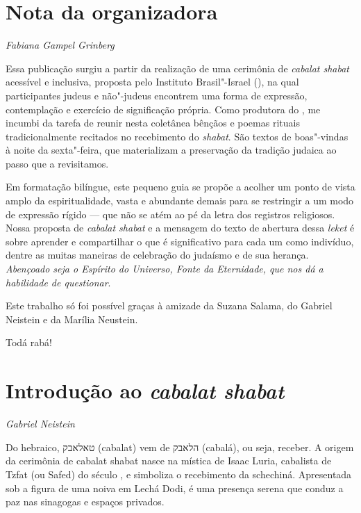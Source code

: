 

\chapter*{Nota da organizadora}


\begin{flushright}
\emph{Fabiana Gampel Grinberg}
\end{flushright}

Essa publicação surgiu a partir da realização de uma cerimônia de \emph{cabalat shabat} acessível e inclusiva, proposta pelo Instituto Brasil"-Israel (), na qual participantes judeus e não"-judeus encontrem uma forma de expressão, contemplação e exercício de significação própria. Como produtora do , me incumbi da tarefa de reunir nesta coletânea bênçãos e poemas rituais tradicionalmente recitados no recebimento do \emph{shabat}. São textos de boas"-vindas à noite da sexta"-feira, que materializam a preservação da tradição judaica ao passo que a revisitamos.

Em formatação bilíngue, este pequeno guia se propõe a acolher um ponto de vista amplo da espiritualidade, vasta e abundante demais para se restringir a um modo de expressão rígido --- que não se atém ao pé da letra dos registros religiosos. Nossa proposta de \emph{cabalat shabat} e a mensagem do texto de abertura dessa \emph{leket} é sobre aprender e compartilhar o que é significativo para cada um como indivíduo, dentre as muitas maneiras de celebração do judaísmo e de sua herança. \emph{Abençoado seja o Espírito do Universo, Fonte da Eternidade, que nos dá a habilidade de questionar}.

Este trabalho só foi possível graças à amizade da Suzana Salama, do Gabriel Neistein e da Marília Neustein.

Todá rabá!

\chapter*{Introdução ao \emph{cabalat shabat}}


\begin{flushright}
\emph{Gabriel Neistein}
\end{flushright}

Do hebraico, טאלאבק (cabalat) vem de הלאבק (cabalá), ou seja, receber. A
origem da cerimônia de cabalat shabat nasce na mística de Isaac Luria,
cabalista de Tzfat (ou Safed) do século , e simboliza o recebimento
da schechiná. Apresentada sob a figura de uma noiva em Lechá Dodi, é uma
presença serena que conduz a paz nas sinagogas e espaços privados.

